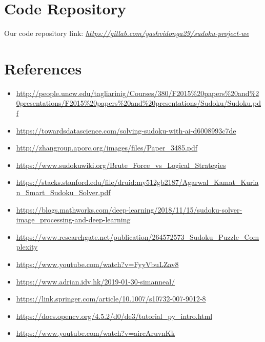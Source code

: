 \documentclass[12pt]{article}
\begin{document}
    \section{Code Repository} 
    Our code repository link: \href{https://gitlab.com/yashvidonga29/sudoku-project-we}{\emph{https://gitlab.com/yashvidonga29/sudoku-project-we}}
    \section{References}   
    \begin{itemize}
         \item \sloppy \url{http://people.uncw.edu/tagliarinig/Courses/380/F2015%20papers%20and%20presentations/F2015%20papers%20and%20presentations/Sudoku/Sudoku.pdf}
        \item \sloppy \url{https://towardsdatascience.com/solving-sudoku-with-ai-d6008993c7de}
        \item \sloppy \url{http://zhangroup.aporc.org/images/files/Paper_3485.pdf}
        \item \sloppy \url{https://www.sudokuwiki.org/Brute_Force_vs_Logical_Strategies}
        \item \sloppy \url{https://stacks.stanford.edu/file/druid:my512gb2187/Agarwal_Kamat_Kurian_Smart_Sudoku_Solver.pdf}
        \item \sloppy \url{https://blogs.mathworks.com/deep-learning/2018/11/15/sudoku-solver-image_processing-and-deep-learning}
        \item \sloppy \url{https://www.researchgate.net/publication/264572573_Sudoku_Puzzle_Complexity}
        \item \sloppy \url{https://www.youtube.com/watch?v=FyyVbuLZav8}
        \item \sloppy \url{https://www.adrian.idv.hk/2019-01-30-simanneal/}
        \item \sloppy \url{https://link.springer.com/article/10.1007/s10732-007-9012-8}
        \item \sloppy \url{https://docs.opencv.org/4.5.2/d0/de3/tutorial_py_intro.html}
        \item \sloppy \url{https://www.youtube.com/watch?v=aircAruvnKk}
    \end{itemize}
\end{document}
